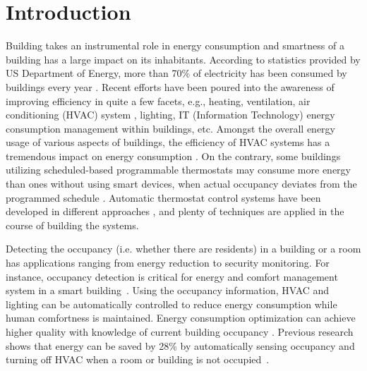 \section{Introduction}
\label{sec:intro}
Building takes an instrumental role in energy consumption and smartness of a
building has a large impact on its inhabitants. According to
statistics provided by US Department of Energy, more than 70\% of electricity
has been consumed by buildings every year \cite{doe_annual}. Recent efforts
have been poured into the awareness of
improving efficiency in quite a few facets, e.g., heating, ventilation, air
conditioning (HVAC) system \cite{erickson2009energy}\cite{gao2009selfprog},
lighting\cite{delaney2009eval}, IT (Information Technology) energy consumption management within
buildings\cite{agarwal2009augnet}\cite{agarwal2010sleep}, etc. Amongst the
overall energy usage of various aspects of buildings, the efficiency of HVAC
systems has a tremendous impact on energy consumption \cite{hobby2012analysis}.
On the contrary, some buildings utilizing scheduled-based
programmable thermostats may consume more energy than ones without using smart
devices, when actual occupancy deviates from the programmed schedule
\cite{bias1999elec}. Automatic thermostat control systems have been developed
in different approaches \cite{thomas2012intelligent}\cite{lu2012eval}, and
plenty of techniques are applied in the course of building the systems.

Detecting the occupancy (i.e. whether there are residents) in a building or a
room has applications ranging from energy reduction to security monitoring. For
instance, occupancy detection is critical for energy and comfort management
system in a smart building~\cite{Nguyen2013Energy}.  Using the occupancy
information, HVAC and lighting can be automatically controlled to reduce energy
consumption while human comfortness is maintained. Energy consumption optimization can
achieve higher quality with knowledge of current building occupancy
\cite{majumdar2014energy}. Previous research shows that energy
can be saved by 28\% by automatically sensing occupancy and turning off HVAC
when a room or building is not occupied~\cite{Lu:SenSys10}.

